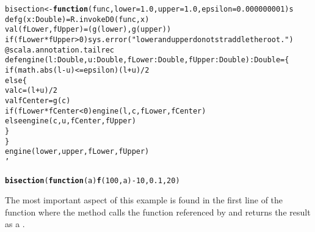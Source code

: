 \documentclass[article]{jss}\usepackage[]{graphicx}\usepackage[]{color}
\makeatletter
\newcommand{\hlnum}[1]{\textcolor[rgb]{0.686,0.059,0.569}{#1}}%
\newcommand{\hlstr}[1]{\textcolor[rgb]{0.192,0.494,0.8}{#1}}%
\newcommand{\hlopt}[1]{\textcolor[rgb]{0,0,0}{#1}}%
\newcommand{\hlstd}[1]{\textcolor[rgb]{0.345,0.345,0.345}{#1}}%
\newcommand{\hlkwa}[1]{\textcolor[rgb]{0.161,0.373,0.58}{\textbf{#1}}}%
\newcommand{\hlkwb}[1]{\textcolor[rgb]{0.69,0.353,0.396}{#1}}%
\newcommand{\hlkwc}[1]{\textcolor[rgb]{0.333,0.667,0.333}{#1}}%
\newcommand{\hlkwd}[1]{\textcolor[rgb]{0.737,0.353,0.396}{\textbf{#1}}}%
\newenvironment{kframe}{%
 \def\at@end@of@kframe{}%
 \ifinner\ifhmode%
  \def\at@end@of@kframe{\end{minipage}}%
  \begin{minipage}{\columnwidth}%
 \fi\fi%
 \def\FrameCommand##1{\hskip\@totalleftmargin \hskip-\fboxsep
 \colorbox{shadecolor}{##1}\hskip-\fboxsep
     \hskip-\linewidth \hskip-\@totalleftmargin \hskip\columnwidth}%
 \MakeFramed {\advance\hsize-\width
   \@totalleftmargin\z@ \linewidth\hsize
   \@setminipage}}%
 {\par\unskip\endMakeFramed%
 \at@end@of@kframe}
\newenvironment{knitrout}{}{} %
\newcommand{\Scala}{\proglang{Scala}\xspace}
\makeatother
\begin{document}
\begin{knitrout}\small
{}\color{fgcolor}\begin{kframe}
\begin{alltt}
\hlstd{bisection} \hlkwb{<-} \hlkwa{function}\hlstd{(}\hlkwc{func}\hlstd{,} \hlkwc{lower}\hlstd{=}\hlnum{1.0}\hlstd{,} \hlkwc{upper}\hlstd{=}\hlnum{1.0}\hlstd{,} \hlkwc{epsilon}\hlstd{=}\hlnum{0.000000001}\hlstd{) s} \hlopt{%!%} \hlstr{'
  def g(x: Double) = R.invokeD0(func, x)
  val (fLower, fUpper) = (g(lower), g(upper))
  if ( fLower * fUpper > 0 ) sys.error("lower and upper do not straddle the root.")
  @scala.annotation.tailrec
  def engine(l: Double, u: Double, fLower: Double, fUpper: Double): Double = \{
    if ( math.abs( l - u ) <= epsilon ) ( l + u ) / 2
    else \{
      val c = ( l + u ) / 2
      val fCenter = g(c)
      if ( fLower * fCenter < 0 ) engine(l, c, fLower, fCenter)
      else engine(c, u, fCenter, fUpper)
    \}
  \}
  engine(lower, upper, fLower, fUpper)
'}

\hlkwd{bisection}\hlstd{(}\hlkwa{function}\hlstd{(}\hlkwc{a}\hlstd{)} \hlkwd{f}\hlstd{(}\hlnum{100}\hlstd{, a)} \hlopt{-} \hlnum{10}\hlstd{,} \hlnum{0.1}\hlstd{,} \hlnum{20}\hlstd{)}
\end{alltt}


{\ttfamily\noindent\bfseries{}}\end{kframe}
\end{knitrout}

The most important aspect of this example is found in the first line of the
\Scala function where the  method calls the  function
referenced by  and returns the result as a .
\end{document}
